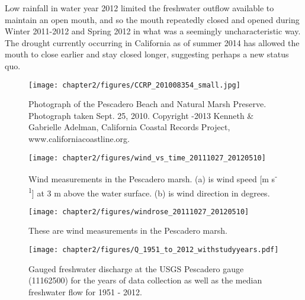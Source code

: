 Low rainfall in water year 2012 limited the freshwater outflow available to maintain an open mouth, and so the mouth repeatedly closed and opened during Winter 2011-2012 and Spring 2012 in what was a seemingly uncharacteristic way. The drought currently occurring in California as of summer 2014 has allowed the mouth to close earlier and stay closed longer, suggesting perhaps a new status quo. 







% 
\begin{figure}
\texttt{[image: chapter2/figures/CCRP\_201008354\_small.jpg]} \caption{Photograph of the Pescadero Beach and Natural Marsh Preserve. Photograph taken Sept. 25,
2010. Copyright -2013 Kenneth \& Gabrielle
Adelman, California Coastal Records Project,
www.californiacoastline.org.} \label{fig:ccrp_2010} \end{figure}


\begin{figure} %
	\texttt{[image: chapter2/figures/wind\_vs\_time\_20111027\_20120510]} \caption{Wind measurements in the Pescadero marsh. (a) is wind speed [m s\textsuperscript{-1}] at 3 m above the water surface. (b) is wind direction in degrees.}
\label{fig:metstn_pdo_ws_wdir} 
\end{figure}

 \begin{figure}
 	\begin{center}
 		\texttt{[image: chapter2/figures/windrose\_20111027\_20120510]} \caption{These are wind measurements in the Pescadero marsh.} \label{fig:metstn_pdo_windrose} 
 	\end{center}
 \end{figure}




\begin{figure}
	\begin{center}
		\texttt{[image: chapter2/figures/Q\_1951\_to\_2012\_withstudyyears.pdf]} \caption{Gauged freshwater discharge at the USGS Pescadero gauge (11162500) for the years of data collection as well as the median freshwater flow for 1951 - 2012.}\label{fig:Q_1951_2012}
	\end{center}
\end{figure}



